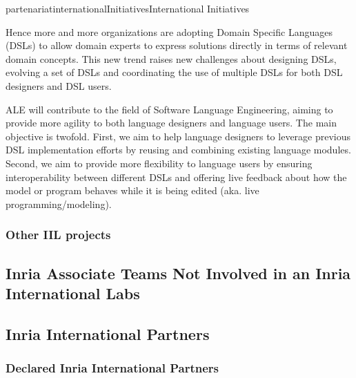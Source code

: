 \documentclass{ra2018}
\begin{document}
\begin{module}{partenariat}{internationalInitiatives}{International Initiatives}
\begin{itemize}
Hence more and more organizations are adopting Domain Specific Languages (DSLs) to allow domain experts to express solutions directly in terms of relevant domain concepts. This new trend raises new challenges about designing DSLs, evolving a set of DSLs and coordinating the use of multiple DSLs for both DSL designers and DSL users.

ALE will contribute to the field of Software Language Engineering, aiming to provide more agility to both language designers and language users. The main objective is twofold. First, we aim to help language designers to leverage previous DSL implementation efforts by reusing and combining existing language modules. Second, we aim to provide more flexibility to  language users by ensuring interoperability between different DSLs and offering live feedback about how the model or program behaves while it is being edited (aka. live programming/modeling). 
\end{itemize}





\subsubsection{Other IIL projects}




\subsection{Inria Associate Teams Not Involved in an Inria International Labs}


%




\subsection{Inria International Partners}

        \subsubsection{Declared Inria International Partners}



\end{module}
\end{document}
